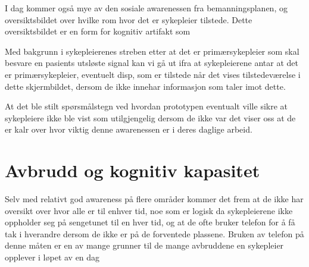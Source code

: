 \noindent
I dag kommer også mye av den sosiale awarenessen fra bemanningsplanen, og oversiktsbildet over hvilke rom hvor det er sykepleier tilstede. Dette oversiktsbildet er en form for kognitiv artifakt som 

Med bakgrunn i sykepleierenes streben etter at det er primærsykepleier som skal besvare en pasients utsløste signal kan vi gå ut ifra at sykepleierene antar at det er primærsykepleier, eventuelt disp, som er tilstede når det vises tilstedeværelse i dette skjermbildet, dersom de ikke innehar informasjon som taler imot dette. 

\noindent
At det ble stilt spørsmålstegn ved hvordan prototypen eventualt ville sikre at sykepleiere ikke ble vist som utilgjengelig dersom de ikke var det viser oss at de er kalr over hvor viktig denne awarenessen er i deres daglige arbeid. 


\section{Avbrudd og kognitiv kapasitet}
\noindent
Selv med relativt god awareness på flere områder kommer det frem at de ikke har oversikt over hvor alle er til enhver tid, noe som er logisk da sykepleierene ikke oppholder seg på sengetunet til en hver tid, og at de ofte bruker telefon for å få tak i hverandre dersom de ikke er på de forventede plassene. Bruken av telefon på denne måten er en av mange grunner til de mange avbruddene en sykepleier opplever i løpet av en dag 
